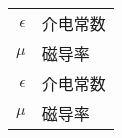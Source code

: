 
\label{chap:symb}

\begin{longtable}{rl}
  $\epsilon$  & 介电常数  \\  
  $\mu$       & 磁导率    \\
  $\epsilon$  & 介电常数  \\
  $\mu$       & 磁导率    \\
\end{longtable}

